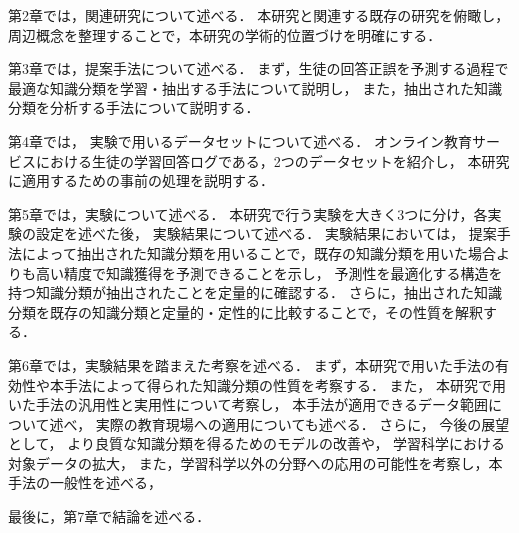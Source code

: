 \vvspace

第2章では，関連研究について述べる．
本研究と関連する既存の研究を俯瞰し，
周辺概念を整理することで，本研究の学術的位置づけを明確にする．

\vvspace

第3章では，提案手法について述べる．
まず，生徒の回答正誤を予測する過程で最適な知識分類を学習・抽出する手法について説明し，
また，抽出された知識分類を分析する手法について説明する．

\vvspace

第4章では，
実験で用いるデータセットについて述べる．
オンライン教育サービスにおける生徒の学習回答ログである，2つのデータセットを紹介し，
本研究に適用するための事前の処理を説明する．

\vvspace

第5章では，実験について述べる．
本研究で行う実験を大きく3つに分け，各実験の設定を述べた後，
実験結果について述べる．
実験結果においては，
提案手法によって抽出された知識分類を用いることで，既存の知識分類を用いた場合よりも高い精度で知識獲得を予測できることを示し，
予測性を最適化する構造を持つ知識分類が抽出されたことを定量的に確認する．
さらに，抽出された知識分類を既存の知識分類と定量的・定性的に比較することで，その性質を解釈する．

\vvspace

第6章では，実験結果を踏まえた考察を述べる．
まず，本研究で用いた手法の有効性や本手法によって得られた知識分類の性質を考察する．
また，
本研究で用いた手法の汎用性と実用性について考察し，
本手法が適用できるデータ範囲について述べ，
実際の教育現場への適用についても述べる．
さらに，
今後の展望として，
より良質な知識分類を得るためのモデルの改善や，
学習科学における対象データの拡大，
また，学習科学以外の分野への応用の可能性を考察し，本手法の一般性を述べる，

\vvspace

最後に，第7章で結論を述べる．
